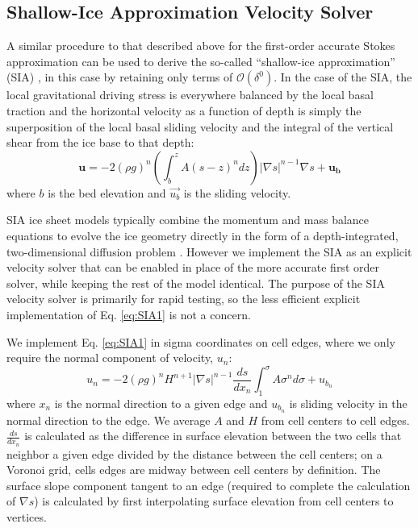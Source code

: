 \subsection{Shallow-Ice Approximation Velocity Solver}
\label{sec:zoMomBal} %

A similar procedure to that described above for the first-order accurate Stokes approximation can be used to derive the so-called ``shallow-ice approximation'' (SIA) \citep{Hutter1983, Fowler1978a, Morland1980,payne2000}, in this case by retaining only terms of $\mathcal{O}(\delta^0)$. In the case of the SIA, the local gravitational driving stress is everywhere balanced by the local basal traction and the horizontal velocity as a function of depth is simply the superposition of the local basal sliding velocity and the integral of the vertical shear from the ice base to that depth:
\begin{equation}
\boldsymbol{u} = -2(\rho g)^{n} \left(\int_{b}^{z} A (s-z)^{n} dz \right) |\nabla s|^{n-1} \nabla s + \boldsymbol{u_b}
\label{eq:SIA1}
\end{equation}
where $b$ is the bed elevation and $\vec{u_b}$ is the sliding velocity. 

SIA ice sheet models typically combine the momentum and mass balance equations to evolve the ice geometry directly in the form of a depth-integrated, two-dimensional diffusion problem \citep{Hindmarsh1996,payne2000}.
However we implement the SIA as an explicit velocity solver that can be enabled in place of the more accurate first order solver,
while keeping the rest of the model identical.
The purpose of the SIA velocity solver is primarily for rapid testing, so the less efficient explicit implementation  of Eq. \ref{eq:SIA1} is not a concern. 

We implement Eq. \ref{eq:SIA1} in sigma coordinates on cell edges, where
we only require the normal component of velocity, $u_n$:
\begin{equation}
u_n = -2(\rho g)^{n} H^{n+1} |\nabla s|^{n-1} \frac{ds}{dx_n} \int_{1}^{\sigma} A \sigma^n d\sigma + u_{b_n}
\label{eq:SIA2}
\end{equation}
where $x_n$ is the normal direction to a given edge and $u_{b_n}$ is sliding velocity in the normal direction to the edge.
We average $A$ and $H$ from cell centers to cell edges.  
$\frac{ds}{dx_n}$ is calculated as the difference in surface elevation between the 
two cells that neighbor a given edge divided by the distance between the cell centers;
on a Voronoi grid, cells edges are midway between cell centers by definition.
The surface slope component tangent to an edge (required to complete the calculation of $\nabla s$) is calculated by first interpolating surface elevation from cell centers to vertices. 


